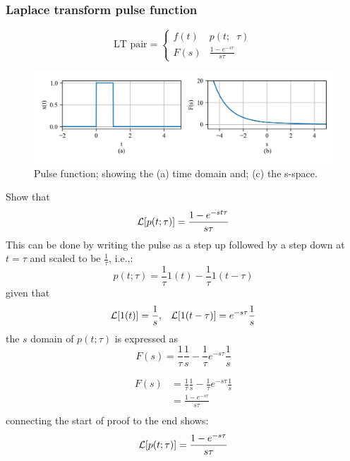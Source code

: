 \documentclass[12pt,letter]{article}
\begin{document}
		\subsubsection{Laplace transform pulse function}

		\begin{equation}
		\text{LT pair} =
			\begin{cases}
			f(t) & p(t; \; \; \tau) \\
			F(s) & \frac{1-e^{-s \tau}}{s \tau}
			\end{cases}
		\end{equation}

		\begin{figure}[H]
			\centering
			\includegraphics[width=6.5in]{../figures/T_and_S_pulse_function}
			\caption{Pulse function; showing the (a) time domain and; (c) the s-space.}
			\label{fig:Laplace_pulse_transform}
		\end{figure}


\begin{mdframed}[middlelinewidth=0.5mm]
\begin{center}
\end{center}
Show that
\begin{equation}
\mathcal{L}{\left[p(t;\tau)\right]} = \frac{1-e^{-st\tau}}{s \tau}
\end{equation}
This can be done by writing the pulse as a step up followed by a step down at $t=\tau$ and scaled to be $\frac{1}{\tau}$, i.e.,:
\begin{equation}
p(t;\tau) = \frac{1}{\tau}1(t) - \frac{1}{\tau} 1 (t-\tau)
\end{equation}
given that
\begin{equation}
\mathcal{L}{\left[1(t)\right]} =  \frac{1}{s}, \; \; \; \mathcal{L}{\left[1 (t-\tau)\right]} = e^{-s \tau} \frac{1}{s}
\end{equation}
the $s$ domain of $p(t;\tau)$ is expressed as
\begin{equation}
F(s) =   \frac{1}{\tau}  \frac{1}{s}  - \frac{1}{\tau} e^{-s \tau} \frac{1}{s}
\end{equation}

\begin{align}
	 F(s) &=   \frac{1}{\tau}  \frac{1}{s}  - \frac{1}{\tau} e^{-s \tau} \frac{1}{s} \\ \nonumber
	&=  \frac{1-e^{-s \tau}}{s \tau} \\ \nonumber
\end{align}
connecting the start of proof to the end shows:
\begin{equation}
\mathcal{L}{\left[p(t;\tau)\right]} = \frac{1-e^{-s \tau}}{s \tau}
\end{equation}

\end{mdframed}
\end{document}
